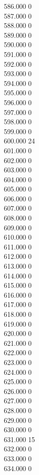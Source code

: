 { 586.000	0 \\
 587.000	0 \\
 588.000	0 \\
 589.000	0 \\
 590.000	0 \\
 591.000	0 \\
 592.000	0 \\
 593.000	0 \\
 594.000	0 \\
 595.000	0 \\
 596.000	0 \\
 597.000	0 \\
 598.000	0 \\
 599.000	0 \\
 600.000	24 \\
 601.000	0 \\
 602.000	0 \\
 603.000	0 \\
 604.000	0 \\
 605.000	0 \\
 606.000	0 \\
 607.000	0 \\
 608.000	0 \\
 609.000	0 \\
 610.000	0 \\
 611.000	0 \\
 612.000	0 \\
 613.000	0 \\
 614.000	0 \\
 615.000	0 \\
 616.000	0 \\
 617.000	0 \\
 618.000	0 \\
 619.000	0 \\
 620.000	0 \\
 621.000	0 \\
 622.000	0 \\
 623.000	0 \\
 624.000	0 \\
 625.000	0 \\
 626.000	0 \\
 627.000	0 \\
 628.000	0 \\
 629.000	0 \\
 630.000	0 \\
 631.000	15 \\
 632.000	0 \\
 633.000	0 \\
 634.000	0 \\
}
